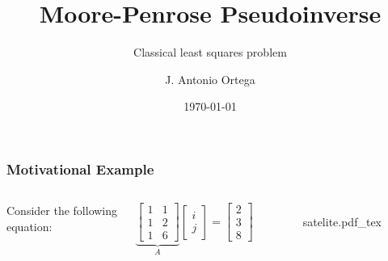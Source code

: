 \documentclass[aspectratio=169]{beamer}
\title[Penrose Pseudoinverse]{Moore-Penrose Pseudoinverse}
\subtitle{Classical least squares problem}
\author{J. Antonio Ortega}
\institute{UNAM}
\date{\today}
\newcommand{\incfig}[2][1]{%
    \def\svgwidth{#1\columnwidth}
    {#2.pdf_tex} }
\begin{document}

\frame{\titlepage}

\begin{frame} %
	\frametitle{Motivational Example}  %
	\begin{columns}

	

	Consider the following equation:

	\begin{equation*}
		\underbrace{\begin{bmatrix} 1 & 1 \\ 1 & 2 \\ 1 & 6 \end{bmatrix}}_A \begin{bmatrix} i \\ j  \end{bmatrix} = \begin{bmatrix} 2 \\ 3 \\ 8\end{bmatrix}
	\end{equation*}
	

	\begin{figure}[ht]
    		\centering
	    \incfig{satelite}
	\end{figure}
	\end{columns}


\end{frame}
\end{document}
